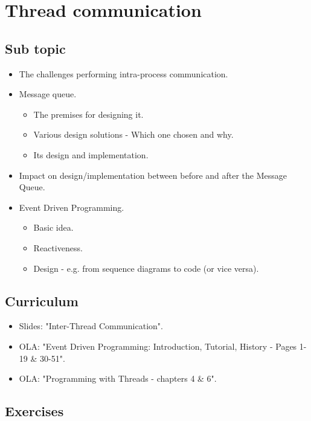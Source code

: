 \section{Thread communication}

\subsection{Sub topic}

\begin{itemize}
	\item The challenges performing intra-process communication.
	\item Message queue.
	\begin{itemize}
		\item The premises for designing it.
		\item Various design solutions - Which one chosen and why.
		\item Its design and implementation.
	\end{itemize}	
	\item Impact on design/implementation between before and after the Message Queue.
	\item Event Driven Programming.
	\begin{itemize}
		\item Basic idea.
		\item Reactiveness.
		\item Design - e.g. from sequence diagrams to code (or vice versa).
	\end{itemize}
\end{itemize}

\subsection{Curriculum}

\begin{itemize}
	\item Slides: "Inter-Thread Communication".
	\item OLA: "Event Driven Programming: Introduction, Tutorial, History - Pages 1-19 \& 30-51".
	\item OLA: "Programming with Threads - chapters 4 \& 6".
\end{itemize}

\subsection{Exercises}

